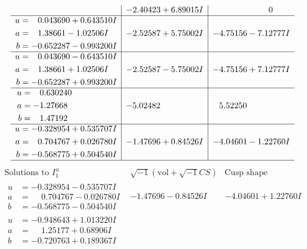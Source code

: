 \documentclass[1p]{elsarticle_modified}
\theoremstyle{definition}
\newcommand{\I}{\sqrt{-1}}
\begin{document}
$$\begin{array}{c|c|c}
 & -2.40423 + 6.89015 I & \phantom{-0.000000 } 0 \\ \hline\begin{aligned}
u &= \phantom{-}0.043690 + 0.643510 I \\
a &= \phantom{-}1.38661 - 1.02506 I \\
b &= -0.652287 - 0.993200 I\end{aligned}
 & -2.52587 + 5.75002 I & -4.75156 - 7.12777 I \\ \hline\begin{aligned}
u &= \phantom{-}0.043690 - 0.643510 I \\
a &= \phantom{-}1.38661 + 1.02506 I \\
b &= -0.652287 + 0.993200 I\end{aligned}
 & -2.52587 - 5.75002 I & -4.75156 + 7.12777 I \\ \hline\begin{aligned}
u &= \phantom{-}0.630240\phantom{ +0.000000I} \\
a &= -1.27668\phantom{ +0.000000I} \\
b &= \phantom{-}1.47192\phantom{ +0.000000I}\end{aligned}
 & -5.02482\phantom{ +0.000000I} & \phantom{-}5.52250\phantom{ +0.000000I} \\ \hline\begin{aligned}
u &= -0.328954 + 0.535707 I \\
a &= \phantom{-}0.704767 + 0.026780 I \\
b &= -0.568775 + 0.504540 I\end{aligned}
 & -1.47696 + 0.84526 I & -4.04601 - 1.22760 I\\
 \hline 
 \end{array}$$\newpage$$\begin{array}{c|c|c}  
\text{Solutions to }I^u_{1}& \I (\text{vol} + \sqrt{-1}CS) & \text{Cusp shape}\\
 \hline 
\begin{aligned}
u &= -0.328954 - 0.535707 I \\
a &= \phantom{-}0.704767 - 0.026780 I \\
b &= -0.568775 - 0.504540 I\end{aligned}
 & -1.47696 - 0.84526 I & -4.04601 + 1.22760 I \\ \hline\begin{aligned}
u &= -0.948643 + 1.013220 I \\
a &= \phantom{-}1.25177 + 0.68906 I \\
b &= -0.720763 + 0.189367 I\end{aligned}

\end{array}$$
\end{document}
